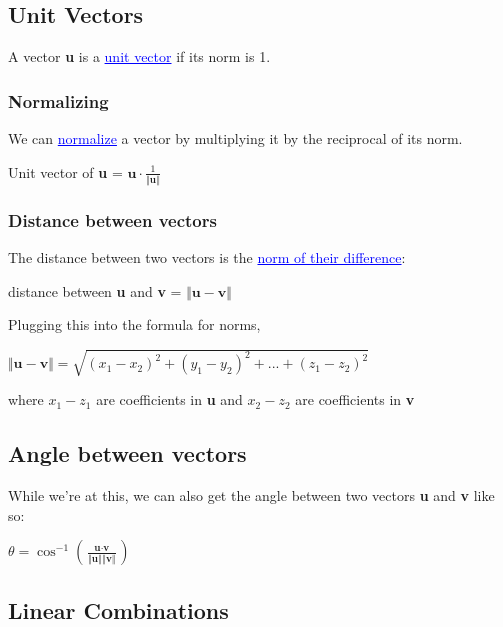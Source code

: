 \documentclass{article}
\newcommand{\bul}[1]{\textcolor{blue}{\underline{#1}}}
\begin{document}
\subsection{Unit Vectors}
A vector \textbf{u} is a \bul{unit vector} if its norm is 1.

\subsubsection{Normalizing}

We can \bul{normalize} a vector by multiplying it by the reciprocal of its norm.
\begin{center}
    Unit vector of \textbf{u} = $\textbf{u} \cdot \frac{1}{\Vert \textbf{u} \Vert}$
\end{center}

\subsubsection{Distance between vectors}
The distance between two vectors is the \bul{norm of their difference}:

\begin{center}
    distance between \textbf{u} and \textbf{v} = $\Vert \textbf{u} - \textbf{v} \Vert$
\end{center}

Plugging this into the formula for norms,

\begin{center}
    $\Vert \textbf{u} - \textbf{v} \Vert = \sqrt{(x_1 - x_2)^2 + (y_1 - y_2)^2 + ... + (z_1 - z_2)^2}$
\end{center}where $x_1 - z_1$ are coefficients in \textbf{u} and $x_2 - z_2$ are coefficients in \textbf{v}

\subsection{Angle between vectors}

While we're at this, we can also get the angle between two vectors \textbf{u} and \textbf{v} like so:

\begin{center}
    $\theta = \cos^{-1}(\frac{\textbf{u}\cdot\textbf{v}}{\Vert \textbf{u} \Vert \Vert \textbf{v} \Vert})$
\end{center}

\subsection{Linear Combinations}
\end{document}

